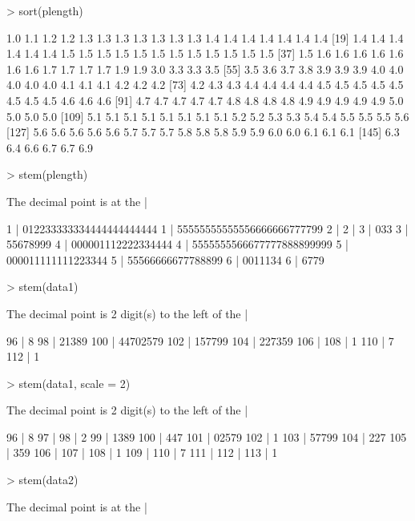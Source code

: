 \documentclass[12pt,letterpaper,final]{article}
\begin{document}
\begin{Schunk}
\begin{Sinput}
> sort(plength)
\end{Sinput}
\begin{Soutput}
  [1] 1.0 1.1 1.2 1.2 1.3 1.3 1.3 1.3 1.3 1.3 1.3 1.4 1.4 1.4 1.4 1.4 1.4 1.4
 [19] 1.4 1.4 1.4 1.4 1.4 1.4 1.5 1.5 1.5 1.5 1.5 1.5 1.5 1.5 1.5 1.5 1.5 1.5
 [37] 1.5 1.6 1.6 1.6 1.6 1.6 1.6 1.6 1.7 1.7 1.7 1.7 1.9 1.9 3.0 3.3 3.3 3.5
 [55] 3.5 3.6 3.7 3.8 3.9 3.9 3.9 4.0 4.0 4.0 4.0 4.0 4.1 4.1 4.1 4.2 4.2 4.2
 [73] 4.2 4.3 4.3 4.4 4.4 4.4 4.4 4.5 4.5 4.5 4.5 4.5 4.5 4.5 4.5 4.6 4.6 4.6
 [91] 4.7 4.7 4.7 4.7 4.7 4.8 4.8 4.8 4.8 4.9 4.9 4.9 4.9 4.9 5.0 5.0 5.0 5.0
[109] 5.1 5.1 5.1 5.1 5.1 5.1 5.1 5.1 5.2 5.2 5.3 5.3 5.4 5.4 5.5 5.5 5.5 5.6
[127] 5.6 5.6 5.6 5.6 5.6 5.7 5.7 5.7 5.8 5.8 5.8 5.9 5.9 6.0 6.0 6.1 6.1 6.1
[145] 6.3 6.4 6.6 6.7 6.7 6.9
\end{Soutput}
\begin{Sinput}
> stem(plength)
\end{Sinput}
\begin{Soutput}
  The decimal point is at the |

  1 | 012233333334444444444444
  1 | 55555555555556666666777799
  2 | 
  2 | 
  3 | 033
  3 | 55678999
  4 | 000001112222334444
  4 | 5555555566677777888899999
  5 | 000011111111223344
  5 | 55566666677788899
  6 | 0011134
  6 | 6779
\end{Soutput}
\begin{Sinput}
> stem(data1)
\end{Sinput}
\begin{Soutput}
  The decimal point is 2 digit(s) to the left of the |

   96 | 8
   98 | 21389
  100 | 44702579
  102 | 157799
  104 | 227359
  106 | 
  108 | 1
  110 | 7
  112 | 1
\end{Soutput}
\begin{Sinput}
> stem(data1, scale = 2)
\end{Sinput}
\begin{Soutput}
  The decimal point is 2 digit(s) to the left of the |

   96 | 8
   97 | 
   98 | 2
   99 | 1389
  100 | 447
  101 | 02579
  102 | 1
  103 | 57799
  104 | 227
  105 | 359
  106 | 
  107 | 
  108 | 1
  109 | 
  110 | 7
  111 | 
  112 | 
  113 | 1
\end{Soutput}
\begin{Sinput}
> stem(data2)
\end{Sinput}
\begin{Soutput}
  The decimal point is at the |


\end{Soutput}
\end{Schunk}
\end{document}

